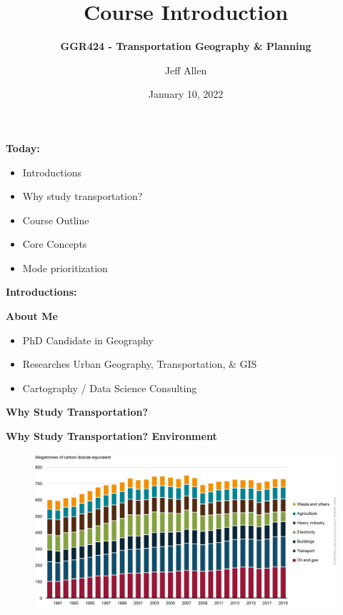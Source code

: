 \documentclass[aspectratio=169]{beamer}
\title{\textbf{Course Introduction}}
\subtitle{\textbf{GGR424 - Transportation Geography \& Planning}}
\author{Jeff Allen}
\institute{University of Toronto}
\date{January 10, 2022}
\begin{document}
	
\begin{frame}
	\titlepage	
\end{frame}



\begin{frame}
\textbf{Today:}
\begin{itemize}
	\item Introductions
	\item Why study transportation?
	\item Course Outline
	\item Core Concepts
	\item Mode prioritization
\end{itemize}
\end{frame}




\begin{frame}
\LARGE{\textbf{Introductions:}}
\end{frame}

\begin{frame}
\textbf{About Me}
\begin{itemize}
	\item PhD Candidate in Geography
	\item Researches Urban Geography, Transportation, \& GIS
	\item Cartography / Data Science Consulting
\end{itemize}
\end{frame}





\begin{frame}
	\LARGE{\textbf{Why Study Transportation?}}
\end{frame}






\begin{frame}
	\textbf{Why Study Transportation? Environment}
	\begin{figure}
		\centering
		\includegraphics[width=0.8\linewidth]{images/canada_emissions_by_sector.png}
	\end{figure}
\end{frame}
\end{document}
